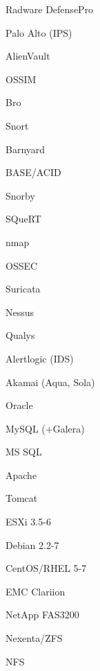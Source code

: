\documentclass[letterpaper,10pt,final]{memoir}
\begin{document}
{
\begin{multicols}{4}
\begin{compactitem}[\color{Black}$\bullet$]
\item Radware DefensePro
\item Palo Alto (IPS)
\item AlienVault
\item OSSIM
\item Bro
\item Snort
\item Barnyard
\item BASE/ACID
\item Snorby
\item SQueRT
\item nmap
\item OSSEC
\item Suricata
\item Nessus
\item Qualys
\item Alertlogic (IDS)
\end{compactitem}
\end{multicols}
\SmallSep

\begin{multicols}{4}
\begin{compactitem}[\color{Black}$\bullet$]
\item Akamai (Aqua, Sola)
\item Oracle
\item MySQL (+Galera)
\item MS SQL
\item Apache
\item Tomcat
\end{compactitem}
\end{multicols}
\SmallSep

\begin{multicols}{4}
\begin{compactitem}[\color{Black}$\bullet$]
\item ESXi 3.5-6
\item Debian 2.2-7
\item CentOS/RHEL 5-7
\end{compactitem}
\end{multicols}
\SmallSep

\begin{multicols}{4}
\begin{compactitem}[\color{Black}$\bullet$]
\item EMC Clariion
\item NetApp FAS3200
\item Nexenta/ZFS
\item NFS
\end{compactitem}
\end{multicols}
\SmallSep

}
\end{document}
